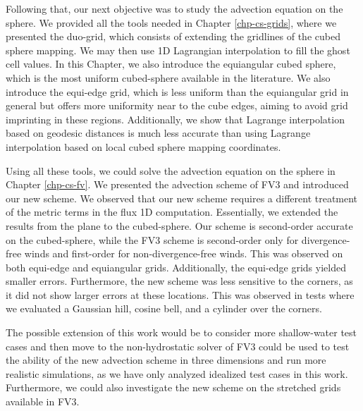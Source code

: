 Following that, our next objective was to study the advection equation on the sphere. 
We provided all the tools needed in Chapter \ref{chp-cs-grids}, 
where we presented the duo-grid, which consists of extending the gridlines of the cubed sphere mapping. 
We may then use 1D Lagrangian interpolation to fill the ghost cell values.
In this Chapter, we also introduce the equiangular cubed sphere, which is the most uniform cubed-sphere available in the literature.
We also introduce the equi-edge grid, which is less uniform than the equiangular grid in general but offers more uniformity near to the cube edges,
aiming to avoid grid imprinting in these regions.
Additionally, we show that Lagrange interpolation based on geodesic distances 
is much less accurate than using Lagrange interpolation based on local cubed sphere mapping coordinates.

Using all these tools, we could solve the advection equation on the sphere in Chapter \ref{chp-cs-fv}.
We presented the advection scheme of FV3 and introduced our new scheme. We observed that our new scheme
requires a different treatment of the metric terms in the flux 1D computation.
Essentially, we extended the results from the plane to the cubed-sphere.
Our scheme is second-order accurate on the cubed-sphere, 
while the FV3 scheme is second-order only for divergence-free winds and first-order for non-divergence-free winds.
This was observed on both equi-edge and equiangular grids. Additionally, the equi-edge grids yielded smaller errors.
Furthermore, the new scheme was less sensitive to the corners, as it did not show larger errors at these locations. 
This was observed in tests where we evaluated a Gaussian hill, cosine bell, and a cylinder over the corners. 

The possible extension of this work would be to consider more shallow-water test cases and then move to 
the non-hydrostatic solver of FV3 could be used to test the ability of the new advection scheme in three 
dimensions and run more realistic simulations, as we have only analyzed idealized test cases in this work.
Furthermore, we could also investigate the new scheme on the stretched grids available in FV3.
